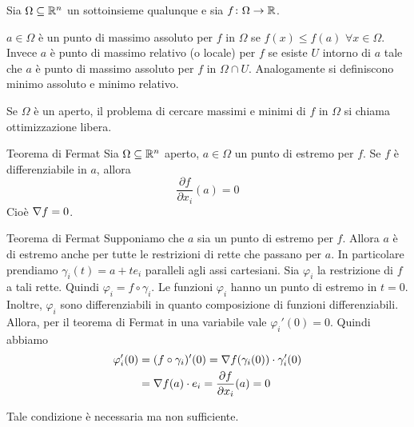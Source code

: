\documentclass[a4paper]{article}
\begin{document}
\begin{radioactive}
Sia \(\Omega \subseteq \mathbb{R}^n\) un sottoinsieme qualunque e sia \(f \colon \Omega \to \mathbb{R}\).

\begin{snippetdefinition}{}
    \(a\in \Omega\) è un punto di massimo assoluto per \(f\) in \(\Omega\)
    se \(f(x) \leq f(a)\) \(\forall x \in \Omega\).
    Invece \(a\) è punto di massimo relativo (o locale) per \(f\)
    se esiste \(U\) intorno di \(a\) tale che \(a\) è punto
    di massimo assoluto per \(f\) in \(\Omega \cap U\).
    Analogamente si definiscono minimo assoluto e minimo relativo.
\end{snippetdefinition}

Se \(\Omega\) è un aperto, il problema di cercare
massimi e minimi di \(f\) in \(\Omega\)
si chiama ottimizzazione libera.

\begin{snippettheorem}{Teorema di Fermat}
    Sia \(\Omega \subseteq \mathbb{R}^n\)
    aperto, \(a \in \Omega\) un punto di estremo per \(f\).
    Se \(f\) è differenziabile in \(a\),
    allora
    \[
        \frac{\partial f}{\partial x_i}(a) = 0
    \]
    Cioè \(\nabla f =0\).
\end{snippettheorem}

\begin{snippetproof}{Teorema di Fermat}
    Supponiamo che \(a\) sia un punto di estremo per \(f\).
    Allora \(a\) è di estremo anche per tutte le restrizioni di rette che passano per \(a\).
    In particolare prendiamo \(\gamma_i(t) = a + te_i\)
    paralleli agli assi cartesiani.
    Sia \(\varphi_i\) la restrizione di \(f\) a tali rette.
    Quindi \(\varphi_i = f \circ \gamma_i\).
    Le funzioni \(\varphi_i\) hanno un punto di estremo in \(t=0\).
    Inoltre, \(\varphi_i\)
    sono differenziabili in quanto composizione di funzioni differenziabili.
    Allora, per il teorema di Fermat in una variabile vale \(\varphi_i'(0) = 0 \).
    Quindi abbiamo
    \begin{align*}
        \varphi_i'(0) &= (f \circ \gamma_i)'(0) = \nabla f(\gamma_i (0)) \cdot \gamma_i'(0) \\
        &= \nabla f(a) \cdot e_i = \frac{\partial f}{\partial x_i} (a) = 0
    \end{align*}
\end{snippetproof}

Tale condizione è necessaria ma non sufficiente.
\end{radioactive}
\end{document}
